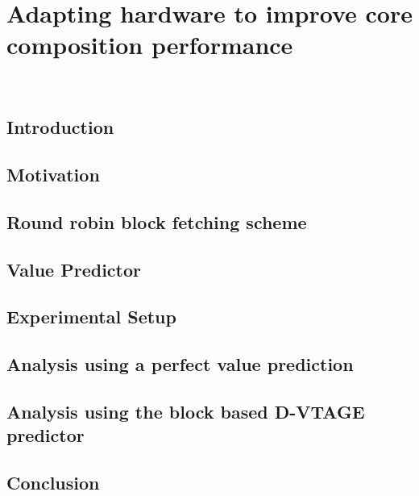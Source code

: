 \chapter{Adapting hardware to improve core composition performance}~\label{chp:hardchanges}

\section{Introduction}\label{sect:introduction-chapter3}

\section{Motivation}\label{sect:ch3-motivation}

\section{Round robin block fetching scheme}\label{chp3:sec:fetch}

\section{Value Predictor}
\label{chp3:sec:val}
\section{Experimental Setup}
\label{chp:chp3:sec:exp}
\section{Analysis using a perfect value prediction}\label{chp:chp3:sec:analysis}

\section{Analysis using the block based D-VTAGE predictor}
\label{chp:chp3:sec:analysis2}
\section{Conclusion}

%
%